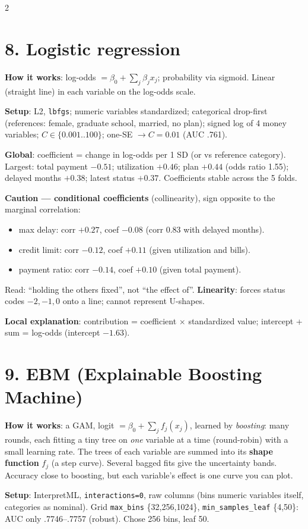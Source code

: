 \documentclass[a4paper,9pt]{extarticle}
\begin{document}
\begin{multicols}{2}
\section{8. Logistic regression}
\textbf{How it works}: log-odds $= \beta_0 + \sum_j \beta_j x_j$; probability via sigmoid. Linear (straight
line) in each variable on the log-odds scale.

\textbf{Setup}: L2, \texttt{lbfgs}; numeric variables standardized; categorical drop-first (references: female,
graduate school, married, no plan); signed log of 4 money variables; $C \in \{0.001..100\}$; one-SE $\to C=0.01$
(AUC .761).

\textbf{Global}: coefficient = change in log-odds per 1 SD (or vs reference category). Largest: total payment
$-0.51$; utilization $+0.46$; plan $+0.44$ (odds ratio 1.55); delayed months $+0.38$; latest status $+0.37$.
Coefficients stable across the 5 folds.

\textbf{Caution --- conditional coefficients} (collinearity), sign opposite to the marginal correlation:
\begin{itemize}
\item max delay: corr $+0.27$, coef $-0.08$ (corr 0.83 with delayed months).
\item credit limit: corr $-0.12$, coef $+0.11$ (given utilization and bills).
\item payment ratio: corr $-0.14$, coef $+0.10$ (given total payment).
\end{itemize}
Read: ``holding the others fixed'', not ``the effect of''.
\textbf{Linearity}: forces status codes $-2,-1,0$ onto a line; cannot represent U-shapes.

\textbf{Local explanation}: contribution = coefficient $\times$ standardized value; intercept + sum =
log-odds (intercept $-1.63$).

\section{9. EBM (Explainable Boosting Machine)}
\textbf{How it works}: a GAM, logit $= \beta_0 + \sum_j f_j(x_j)$, learned by \emph{boosting}: many rounds,
each fitting a tiny tree on \emph{one} variable at a time (round-robin) with a small learning rate. The trees of
each variable are summed into its \textbf{shape function} $f_j$ (a step curve). Several bagged fits give the
uncertainty bands. Accuracy close to boosting, but each variable's effect is one curve you can plot.

\textbf{Setup}: InterpretML, \texttt{interactions=0}, raw columns (bins numeric variables itself, categories as
nominal). Grid \texttt{max\_bins} \{32,256,1024\}, \texttt{min\_samples\_leaf} \{4,50\}: AUC only .7746--.7757
(robust). Chose 256 bins, leaf 50.


\end{multicols}
\end{document}
